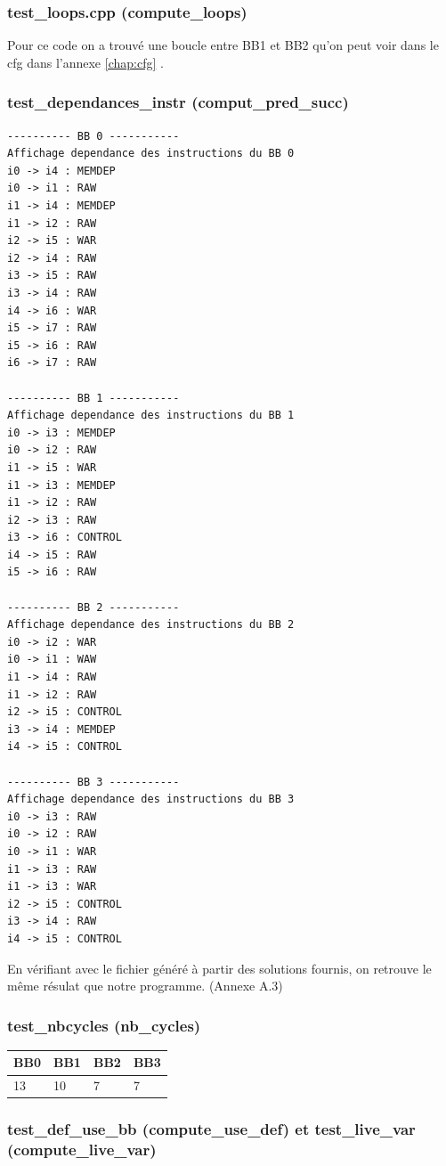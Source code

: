 \documentclass[11pt, openany]{article}
\begin{document}
\subsubsection{test\_loops.cpp (compute\_loops)}
Pour ce code on a trouvé une boucle entre BB1 et BB2 qu'on peut voir dans le cfg dans l'annexe \ref{chap:cfg}
.

\subsubsection{ test\_dependances\_instr (comput\_pred\_succ)}
\begin{lstlisting}
---------- BB 0 -----------
Affichage dependance des instructions du BB 0
i0 -> i4 : MEMDEP
i0 -> i1 : RAW
i1 -> i4 : MEMDEP
i1 -> i2 : RAW
i2 -> i5 : WAR
i2 -> i4 : RAW
i3 -> i5 : RAW
i3 -> i4 : RAW
i4 -> i6 : WAR
i5 -> i7 : RAW
i5 -> i6 : RAW
i6 -> i7 : RAW

---------- BB 1 -----------
Affichage dependance des instructions du BB 1
i0 -> i3 : MEMDEP
i0 -> i2 : RAW
i1 -> i5 : WAR
i1 -> i3 : MEMDEP
i1 -> i2 : RAW
i2 -> i3 : RAW
i3 -> i6 : CONTROL
i4 -> i5 : RAW
i5 -> i6 : RAW

---------- BB 2 -----------
Affichage dependance des instructions du BB 2
i0 -> i2 : WAR
i0 -> i1 : WAW
i1 -> i4 : RAW
i1 -> i2 : RAW
i2 -> i5 : CONTROL
i3 -> i4 : MEMDEP
i4 -> i5 : CONTROL

---------- BB 3 -----------
Affichage dependance des instructions du BB 3
i0 -> i3 : RAW
i0 -> i2 : RAW
i0 -> i1 : WAR
i1 -> i3 : RAW
i1 -> i3 : WAR
i2 -> i5 : CONTROL
i3 -> i4 : RAW
i4 -> i5 : CONTROL
\end{lstlisting}

En vérifiant avec le fichier généré à partir des solutions fournis, on retrouve le même résulat que notre programme. (Annexe A.3)

\subsubsection{test\_nbcycles (nb\_cycles)}

\begin{tabular}{ |p{2.5cm}|p{2.5cm}|p{2.5cm}|p{2.5cm}|  }
 \hline
 BB0 & BB1 & BB2 & BB3\\
 \hline
 13 & 10 & 7 & 7 \\
 \hline
\end{tabular}


\subsubsection{test\_def\_use\_bb (compute\_use\_def) et test\_live\_var (compute\_live\_var)}
\end{document}
